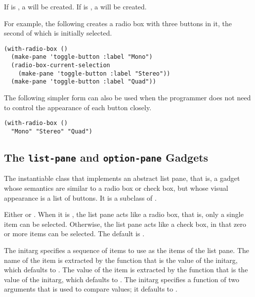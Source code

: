 If  is , a  will be created.  If 
is , a  will be created.

For example, the following creates a radio box with three buttons in it, the
second of which is initially selected.

\begin{verbatim}
(with-radio-box ()
  (make-pane 'toggle-button :label "Mono")
  (radio-box-current-selection
    (make-pane 'toggle-button :label "Stereo"))
  (make-pane 'toggle-button :label "Quad"))
\end{verbatim}

The following simpler form can also be used when the programmer does not need to
control the appearance of each button closely.

\begin{verbatim}
(with-radio-box ()
  "Mono" "Stereo" "Quad")
\end{verbatim}


\subsection {The {\tt list-pane} and {\tt option-pane} Gadgets}


The instantiable class that implements an abstract list pane, that is, a gadget
whose semantics are similar to a radio box or check box, but whose visual
appearance is a list of buttons.  It is a subclass of .


Either  or .  When it is , the
list pane acts like a radio box, that is, only a single item can be selected.
Otherwise, the list pane acts like a check box, in that zero or more items can
be selected. The default is .


The  initarg specifies a sequence of items to use as the items of the
list pane.  The name of the item is extracted by the function that is the value
of the  initarg, which defaults to .  The
value of the item is extracted by the function that is the value of the
 initarg, which defaults to .  The 
initarg specifies a function of two arguments that is used to compare values; it
defaults to .

